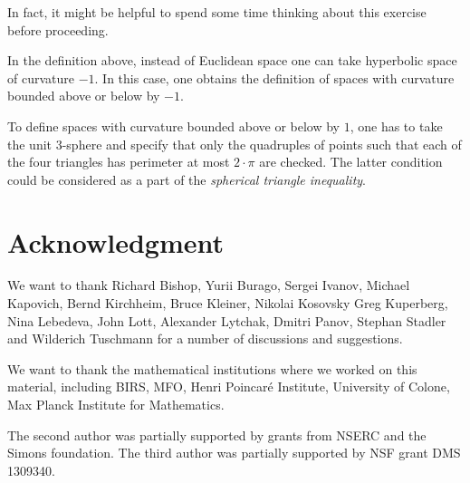 In fact, it might be helpful to spend some time thinking about this exercise before proceeding.

In the definition above, 
instead of  Euclidean space 
one can take  
hyperbolic space of curvature $-1$.
In this case,
one obtains the definition of spaces with curvature bounded above or below by $-1$.

To define spaces with curvature bounded above or below by $1$,
one has to take the unit 3-sphere 
and specify that only the quadruples of points such that each of the four triangles has perimeter 
 at most $2\cdot\pi$ are checked.
The latter condition could be considered as a part of the {}\emph{spherical triangle inequality}.


\section*{Acknowledgment}
We want to thank 
Richard Bishop,
Yurii Burago,
Sergei Ivanov,
Michael Kapovich, 
Bernd Kirchheim, 
Bruce Kleiner,
Nikolai Kosovsky
Greg Kuperberg,
Nina Lebedeva,
John Lott,
Alexander Lytchak,
Dmitri Panov,
Stephan Stadler
and 
Wilderich Tuschmann
for a number of discussions and suggestions.



We want to thank the mathematical institutions where we worked on this material,  including
BIRS, 
MFO, 
Henri Poincar\'{e} Institute,
University of Colone, 
Max Planck Institute for Mathematics. 

The second author was partially supported by grants from NSERC and the Simons foundation.
The third author was partially supported by NSF grant DMS 1309340.










